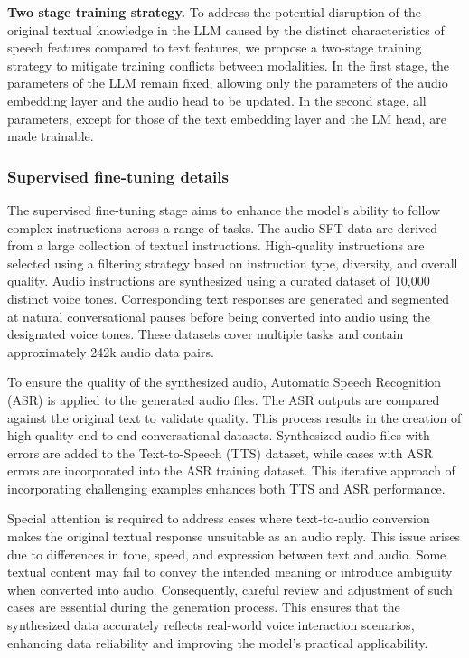 \textbf{Two stage training strategy.}
To address the potential disruption of the original textual knowledge in the LLM caused by the distinct characteristics of speech features compared to text features, we propose a two-stage training strategy to mitigate training conflicts between modalities. In the first stage, the parameters of the LLM remain fixed, allowing only the parameters of the audio embedding layer and the audio head to be updated. In the second stage, all parameters, except for those of the text embedding layer and the LM head, are made trainable.

\subsubsection{Supervised fine-tuning details}
The supervised fine-tuning stage aims to enhance the model's ability to follow complex instructions across a range of tasks. The audio SFT data are derived from a large collection of textual instructions. High-quality instructions are selected using a filtering strategy based on instruction type, diversity, and overall quality. Audio instructions are synthesized using a curated dataset of 10,000 distinct voice tones. Corresponding text responses are generated and segmented at natural conversational pauses before being converted into audio using the designated voice tones. These datasets cover multiple tasks and contain approximately 242k audio data pairs. 

To ensure the quality of the synthesized audio, Automatic Speech Recognition (ASR) is applied to the generated audio files. The ASR outputs are compared against the original text to validate quality. This process results in the creation of high-quality end-to-end conversational datasets. Synthesized audio files with errors are added to the Text-to-Speech (TTS) dataset, while cases with ASR errors are incorporated into the ASR training dataset. This iterative approach of incorporating challenging examples enhances both TTS and ASR performance.

Special attention is required to address cases where text-to-audio conversion makes the original textual response unsuitable as an audio reply. This issue arises due to differences in tone, speed, and expression between text and audio. Some textual content may fail to convey the intended meaning or introduce ambiguity when converted into audio. Consequently, careful review and adjustment of such cases are essential during the generation process. This ensures that the synthesized data accurately reflects real-world voice interaction scenarios, enhancing data reliability and improving the model's practical applicability.





